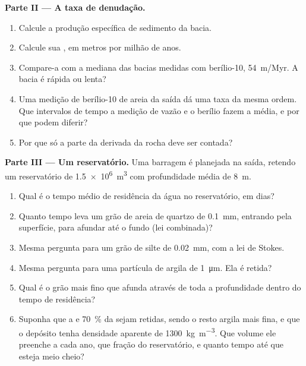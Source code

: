 \begin{problem}
\medskip
\noindent\textbf{Parte II --- A taxa de denudação.}
\begin{enumerate}[resume]
  \item Calcule a produção específica de sedimento da bacia.
  \item Calcule sua , em metros por milhão de anos.
  \item Compare-a com a mediana das bacias medidas com berílio-10, \qty{54}{m/Myr}. A bacia é rápida ou lenta?
  \item Uma medição de berílio-10 de areia da saída dá uma taxa da mesma ordem. Que intervalos de tempo a medição de vazão e o berílio fazem a média, e por que podem diferir?
  \item Por que só a parte da  derivada da rocha deve ser contada?
\end{enumerate}

\medskip
\noindent\textbf{Parte III --- Um reservatório.}
Uma barragem é planejada na saída, retendo um reservatório de \qty{1.5e6}{m^3} com profundidade média de \qty{8}{m}.
\begin{enumerate}[resume]
  \item Qual é o tempo médio de residência da água no reservatório, em dias?
  \item Quanto tempo leva um grão de areia de quartzo de \qty{0.1}{mm}, entrando pela superfície, para afundar até o fundo (lei combinada)?
  \item Mesma pergunta para um grão de silte de \qty{0.02}{mm}, com a lei de Stokes.
  \item Mesma pergunta para uma partícula de argila de \qty{1}{\micro m}. Ela é retida?
  \item Qual é o grão mais fino que afunda através de toda a profundidade dentro do tempo de residência?
  \item Suponha que a  e \qty{70}{\percent} da  sejam retidas, sendo o resto argila mais fina, e que o depósito tenha densidade aparente de \qty{1300}{kg.m^{-3}}. Que volume ele preenche a cada ano, que fração do reservatório, e quanto tempo até que esteja meio cheio?
\end{enumerate}


\end{problem}
